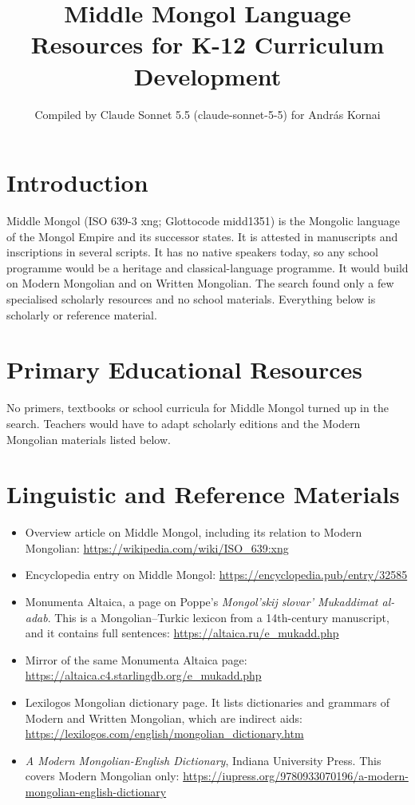 \documentclass[12pt]{article}
\title{Middle Mongol Language Resources for K-12 Curriculum Development}
\author{Compiled by Claude Sonnet 5.5 (claude-sonnet-5-5) for Andr\'as Kornai}
\date{}
\begin{document}
\maketitle

\section{Introduction}
Middle Mongol (ISO 639-3 xng; Glottocode midd1351) is the Mongolic language of the Mongol Empire and its successor states. It is attested in manuscripts and inscriptions in several scripts. It has no native speakers today, so any school programme would be a heritage and classical-language programme. It would build on Modern Mongolian and on Written Mongolian. The search found only a few specialised scholarly resources and no school materials. Everything below is scholarly or reference material.

\section{Primary Educational Resources}
No primers, textbooks or school curricula for Middle Mongol turned up in the search. Teachers would have to adapt scholarly editions and the Modern Mongolian materials listed below.

\section{Linguistic and Reference Materials}
\begin{itemize}
\item Overview article on Middle Mongol, including its relation to Modern Mongolian: \url{https://wikipedia.com/wiki/ISO_639:xng}
\item Encyclopedia entry on Middle Mongol: \url{https://encyclopedia.pub/entry/32585}
\item Monumenta Altaica, a page on Poppe's \emph{Mongol'skij slovar' Mukaddimat al-adab}. This is a Mongolian--Turkic lexicon from a 14th-century manuscript, and it contains full sentences: \url{https://altaica.ru/e_mukadd.php}
\item Mirror of the same Monumenta Altaica page: \url{https://altaica.c4.starlingdb.org/e_mukadd.php}
\item Lexilogos Mongolian dictionary page. It lists dictionaries and grammars of Modern and Written Mongolian, which are indirect aids: \url{https://lexilogos.com/english/mongolian_dictionary.htm}
\item \emph{A Modern Mongolian-English Dictionary}, Indiana University Press. This covers Modern Mongolian only: \url{https://iupress.org/9780933070196/a-modern-mongolian-english-dictionary}
\end{itemize}
\end{document}
